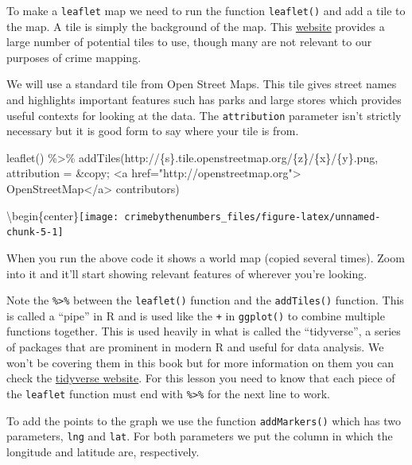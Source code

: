 \documentclass[
  12pt,
]{book}
\newenvironment{Shaded}{\begin{snugshade}}{\end{snugshade}}
\newcommand{\AttributeTok}[1]{\textcolor[rgb]{0.61,0.61,0.61}{#1}}
\newcommand{\FunctionTok}[1]{\textcolor[rgb]{0,0,0}{#1}}
\newcommand{\NormalTok}[1]{#1}
\newcommand{\SpecialCharTok}[1]{\textcolor[rgb]{0,0,0}{#1}}
\newcommand{\StringTok}[1]{\textcolor[rgb]{0.5,0.5,0.5}{#1}}
\begin{document}
To make a \texttt{leaflet} map we need to run the function \texttt{leaflet()} and add a tile to the map. A tile is simply the background of the map. This \href{https://leaflet-extras.github.io/leaflet-providers/preview/}{website} provides a large number of potential tiles to use, though many are not relevant to our purposes of crime mapping.

We will use a standard tile from Open Street Maps. This tile gives street names and highlights important features such has parks and large stores which provides useful contexts for looking at the data. The \texttt{attribution} parameter isn't strictly necessary but it is good form to say where your tile is from.

\begin{Shaded}
\begin{Highlighting}[]
\FunctionTok{leaflet}\NormalTok{() }\SpecialCharTok{\%\textgreater{}\%} 
  \FunctionTok{addTiles}\NormalTok{(}\StringTok{\textquotesingle{}http://\{s\}.tile.openstreetmap.org/\{z\}/\{x\}/\{y\}.png\textquotesingle{}}\NormalTok{, }
           \AttributeTok{attribution =} \StringTok{\textquotesingle{}\&copy; \textless{}a href="http://openstreetmap.org"\textgreater{}}
\StringTok{                OpenStreetMap\textless{}/a\textgreater{} contributors\textquotesingle{}}\NormalTok{)}
\end{Highlighting}
\end{Shaded}

\textbackslash begin\{center\}\texttt{[image: crimebythenumbers\_files/figure-latex/unnamed-chunk-5-1]}

When you run the above code it shows a world map (copied several times). Zoom into it and it'll start showing relevant features of wherever you're looking.

Note the \texttt{\%\textgreater{}\%} between the \texttt{leaflet()} function and the \texttt{addTiles()} function. This is called a ``pipe'' in R and is used like the \texttt{+} in \texttt{ggplot()} to combine multiple functions together. This is used heavily in what is called the ``tidyverse'', a series of packages that are prominent in modern R and useful for data analysis. We won't be covering them in this book but for more information on them you can check the \href{https://www.tidyverse.org/}{tidyverse website}. For this lesson you need to know that each piece of the \texttt{leaflet} function must end with \texttt{\%\textgreater{}\%} for the next line to work.

To add the points to the graph we use the function \texttt{addMarkers()} which has two parameters, \texttt{lng} and \texttt{lat}. For both parameters we put the column in which the longitude and latitude are, respectively.
\end{document}
